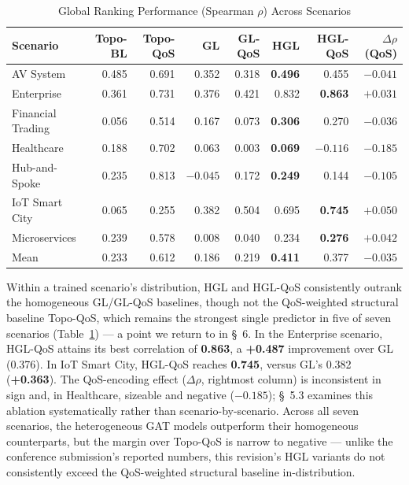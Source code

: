 \documentclass[review]{elsarticle}
\begin{document}
\begin{table}[htbp]
\centering
\caption{Global Ranking Performance (Spearman $\rho$) Across Scenarios}
\label{tab:ranking}
\begin{tabular}{@{}lrrrrrrr@{}}
\toprule
Scenario & Topo-BL & Topo-QoS & GL & GL-QoS & HGL & HGL-QoS & $\Delta\rho$ (QoS) \\
\midrule
AV System & 0.485 & 0.691 & 0.352 & 0.318 & \textbf{0.496} & 0.455 & $-0.041$ \\
Enterprise & 0.361 & 0.731 & 0.376 & 0.421 & 0.832 & \textbf{0.863} & $+0.031$ \\
Financial Trading & 0.056 & 0.514 & 0.167 & 0.073 & \textbf{0.306} & 0.270 & $-0.036$ \\
Healthcare & 0.188 & 0.702 & 0.063 & 0.003 & \textbf{0.069} & $-0.116$ & $-0.185$ \\
Hub-and-Spoke & 0.235 & 0.813 & $-0.045$ & 0.172 & \textbf{0.249} & 0.144 & $-0.105$ \\
IoT Smart City & 0.065 & 0.255 & 0.382 & 0.504 & 0.695 & \textbf{0.745} & $+0.050$ \\
Microservices & 0.239 & 0.578 & 0.008 & 0.040 & 0.234 & \textbf{0.276} & $+0.042$ \\
\midrule
Mean & 0.233 & 0.612 & 0.186 & 0.219 & \textbf{0.411} & 0.377 & $-0.035$ \\
\bottomrule
\end{tabular}
\end{table}

Within a trained scenario's distribution, HGL and HGL-QoS consistently outrank the homogeneous
GL/GL-QoS baselines, though not the QoS-weighted structural baseline Topo-QoS, which remains the
strongest single predictor in five of seven scenarios (Table~\ref{tab:ranking}) --- a point we
return to in \S~6. In the Enterprise scenario, HGL-QoS attains its best correlation of
\textbf{0.863}, a \textbf{+0.487} improvement over GL (0.376). In IoT Smart City, HGL-QoS reaches
\textbf{0.745}, versus GL's 0.382 (\textbf{+0.363}). The QoS-encoding effect ($\Delta\rho$,
rightmost column) is inconsistent in sign and, in Healthcare, sizeable and negative ($-0.185$);
\S~5.3 examines this ablation systematically rather than scenario-by-scenario. Across all seven
scenarios, the heterogeneous GAT models outperform their homogeneous counterparts, but the margin
over Topo-QoS is narrow to negative --- unlike the conference submission's reported numbers, this
revision's HGL variants do not consistently exceed the QoS-weighted structural baseline
in-distribution.
\end{document}
